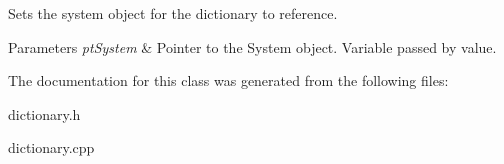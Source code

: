 Sets the system object for the dictionary to reference. 


\begin{DoxyParams}{Parameters}
{\em pt\-System} & Pointer to the System object. Variable passed by value. \\
\hline
\end{DoxyParams}


The documentation for this class was generated from the following files\-:\begin{DoxyCompactItemize}
\item 
dictionary.\-h\item 
dictionary.\-cpp\end{DoxyCompactItemize}
